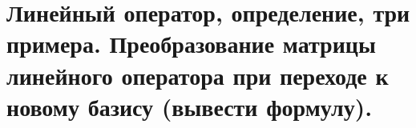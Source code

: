 \section{
    Линейный оператор, определение, три примера. Преобразование матрицы линейного оператора при переходе к новому базису (вывести формулу).
 }


